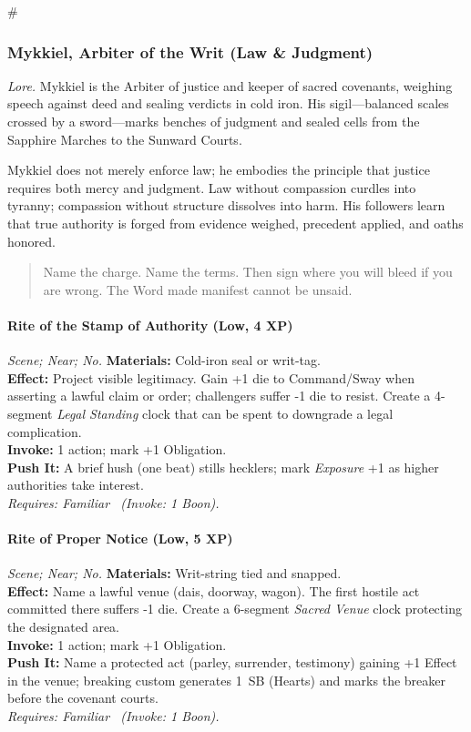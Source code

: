 # %

\subsubsection{Mykkiel, Arbiter of the Writ (Law \& Judgment)}
\textit{Lore.} Mykkiel is the Arbiter of justice and keeper of sacred covenants, weighing speech against deed and sealing verdicts in cold iron. His sigil—balanced scales crossed by a sword—marks benches of judgment and sealed cells from the Sapphire Marches to the Sunward Courts.

Mykkiel does not merely enforce law; he embodies the principle that justice requires both mercy and judgment. Law without compassion curdles into tyranny; compassion without structure dissolves into harm. His followers learn that true authority is forged from evidence weighed, precedent applied, and oaths honored.

\begin{quote}
Name the charge. Name the terms. Then sign where you will bleed if you are wrong. The Word made manifest cannot be unsaid.
\end{quote}

\paragraph*{Rite of the Stamp of Authority (Low, 4 XP)} \emph{Scene; Near; No.}
\textbf{Materials:} Cold-iron seal or writ-tag.\\
\textbf{Effect:} Project visible legitimacy. Gain +1 die to Command/Sway when asserting a lawful claim or order; challengers suffer -1 die to resist. Create a 4-segment \emph{Legal Standing} clock that can be spent to downgrade a legal complication.\\
\textbf{Invoke:} 1 action; mark +1 Obligation.\\
\textbf{Push It:} A brief hush (one beat) stills hecklers; mark \emph{Exposure} +1 as higher authorities take interest.\\
\emph{Requires: Familiar \ (\textit{Invoke:} 1 Boon).}

\paragraph*{Rite of Proper Notice (Low, 5 XP)} \emph{Scene; Near; No.}
\textbf{Materials:} Writ-string tied and snapped.\\
\textbf{Effect:} Name a lawful venue (dais, doorway, wagon). The first hostile act committed there suffers -1 die. Create a 6-segment \emph{Sacred Venue} clock protecting the designated area.\\
\textbf{Invoke:} 1 action; mark +1 Obligation.\\
\textbf{Push It:} Name a protected act (parley, surrender, testimony) gaining +1 Effect in the venue; breaking custom generates 1~SB (Hearts) and marks the breaker before the covenant courts.\\
\emph{Requires: Familiar \ (\textit{Invoke:} 1 Boon).}

